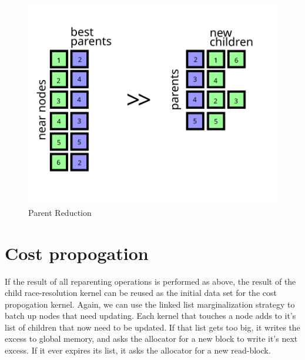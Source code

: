\begin{figure}[H]
\begin{centering}
    \includegraphics[scale=1]{fig/kernel_parent_rotate}
    \caption{Parent Reduction}
\end{centering} 
\end{figure} 


\section{Cost propogation}
If the result of all reparenting operations is performed as above, the result of the child race-resolution kernel can be reused as the initial data set for the cost propogation kernel. Again, we can use the linked list marginalization strategy to batch up nodes that need updating. Each kernel that touches a node adds to it's list of children that now need to be updated. If that list gets too big, it writes the excess to global memory, and asks the allocator for a new block to write it's next excess. If it ever expires its list, it asks the allocator for a new read-block.







 